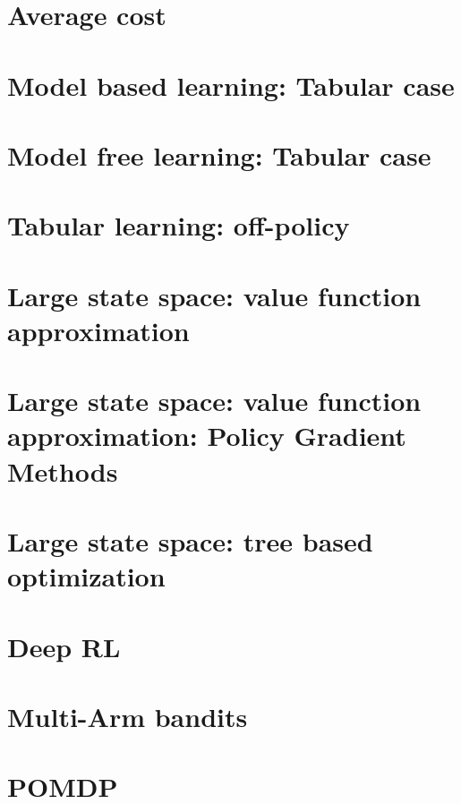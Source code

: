 \documentclass[12pt]{book}
\begin{document}
\chapter{Average cost}
\label{chapter:average}

\chapter{ Model based learning:  Tabular case}

%

\chapter{Model free  learning: Tabular case}
\label{chapter:learning-model-free}
%
%

%

\chapter{Tabular learning: off-policy}
%

\chapter{Large state space: value function approximation}
%
%

\chapter{Large state space: value function approximation: Policy Gradient Methods}
%

\chapter{Large state space: tree based optimization}
%
%

%
%


\chapter{Deep RL}

\chapter{ Multi-Arm bandits}
%

\chapter{POMDP}
\label{chapter:POMDP}
%

\newpage
\appendix

\end{document}
